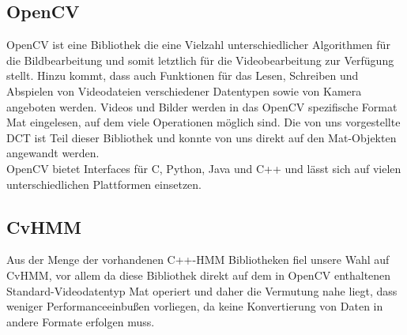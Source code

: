 \subsection{OpenCV}
\label{sec:opencv}
OpenCV\cite{opencv} ist eine Bibliothek die eine Vielzahl unterschiedlicher Algorithmen für die Bildbearbeitung und somit letztlich für die Videobearbeitung zur Verfügung stellt.
 Hinzu kommt, dass auch Funktionen für das Lesen, Schreiben und Abspielen von Videodateien verschiedener Datentypen sowie von Kamera angeboten werden. Videos und Bilder werden in das OpenCV spezifische Format Mat eingelesen, auf dem viele Operationen möglich sind.  Die von uns vorgestellte DCT ist Teil dieser Bibliothek und konnte von uns direkt auf den Mat-Objekten angewandt werden.\\
OpenCV bietet Interfaces für C, Python, Java und C++ und lässt sich auf vielen unterschiedlichen Plattformen einsetzen.


\subsection{CvHMM}
\label{sec:cvhmm}
Aus der Menge der vorhandenen C++-HMM Bibliotheken fiel unsere Wahl auf CvHMM\cite{cvhmmLINK}, vor allem da diese Bibliothek direkt auf dem in OpenCV\cite{opencv} enthaltenen Standard-Videodatentyp Mat operiert und daher die Vermutung nahe liegt, dass weniger Performanceeinbußen vorliegen, da keine Konvertierung von Daten in andere Formate erfolgen muss.\\


